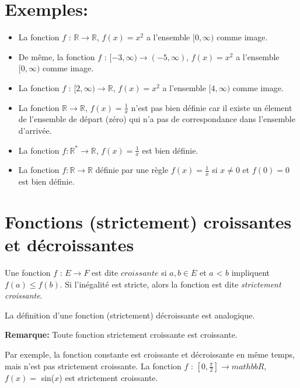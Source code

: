 \section{Exemples:}
\begin{itemize}
    \item La fonction $f$ : $\mathbb{R} \to \mathbb{R}$, $f(x) = x^2$ a l'ensemble $[0, \infty)$ comme image.
    \item De même, la fonction $f$ : $[-3, \infty) \to (-5, \infty)$, $f(x) = x^2$ a l'ensemble $[0, \infty)$ comme image.
    \item La fonction $f$ : $[2, \infty) \to \mathbb{R}$, $f(x) = x^2$ a l'ensemble $[4, \infty)$ comme image.
    \item La fonction $\mathbb{R} \to \mathbb{R}$, $f(x) = \frac{1}{x}$ n'est pas bien définie car il existe un élement de l'ensemble de départ (zéro) qui n'a pas de correspondance dans l'ensemble d'arrivée.
    \item La fonction $f : \mathbb{R^*} \to \mathbb{R}$, $f(x) = \frac{1}{x}$ est bien définie.
    \item La fonction $f : \mathbb{R} \to \mathbb{R}$ définie par une règle $f(x) = \frac{1}{x}$ si $x \neq 0$ et $f(0) = 0$ est bien définie.
\end{itemize}

\section{Fonctions (strictement) croissantes et décroissantes}
\begin{boxdef} Une fonction $f$ : $E \to F$ est dite $croissante$ si $a, b \in E$ et
$a$ < $b$ impliquent $f(a) \leq f(b)$.
Si l'inégalité est stricte, alors la fonction est dite \textit{strictement croissante}.
\end{boxdef}
La définition d'une fonction (strictement) décroissante est analogique.

\textbf{Remarque:} Toute fonction strictement croissante est croissante.

Par exemple, la fonction constante est croissante et décroissante en même temps, mais n'est pas strictement croissante. La fonction $f$ : $[0, \frac{\pi}{2}] \to mathbb{R}$, $f(x) =$ sin($x$) est strictement croissante.


